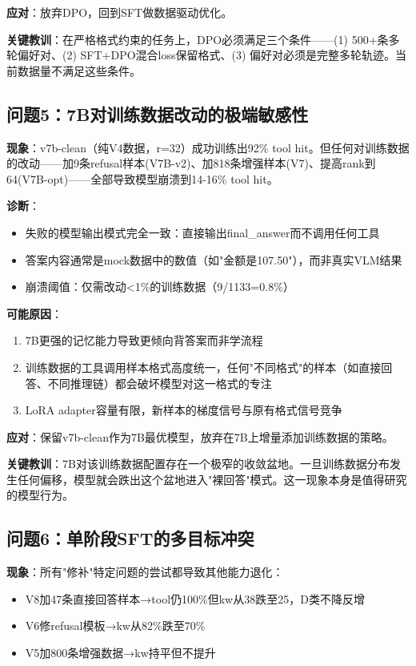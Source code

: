 \documentclass[fontset=none,11pt,a4paper]{ctexart}
\begin{document}
\textbf{应对}：放弃DPO，回到SFT做数据驱动优化。

\textbf{关键教训}：在严格格式约束的任务上，DPO必须满足三个条件------(1) 500+条多轮偏好对、(2) SFT+DPO混合loss保留格式、(3) 偏好对必须是完整多轮轨迹。当前数据量不满足这些条件。

\subsection{问题5：7B对训练数据改动的极端敏感性}

\textbf{现象}：v7b-clean（纯V4数据，r=32）成功训练出92\% tool hit。但任何对训练数据的改动------加9条refusal样本(V7B-v2)、加818条增强样本(V7)、提高rank到64(V7B-opt)------全部导致模型崩溃到14-16\% tool hit。

\textbf{诊断}：
\begin{itemize}[nosep]
    \item 失败的模型输出模式完全一致：直接输出final\_answer而不调用任何工具
    \item 答案内容通常是mock数据中的数值（如"金额是107.50"），而非真实VLM结果
    \item 崩溃阈值：仅需改动<1\%的训练数据（9/1133=0.8\%）
\end{itemize}

\textbf{可能原因}：
\begin{enumerate}[label=(\arabic*),nosep]
    \item 7B更强的记忆能力导致更倾向背答案而非学流程
    \item 训练数据的工具调用样本格式高度统一，任何"不同格式"的样本（如直接回答、不同推理链）都会破坏模型对这一格式的专注
    \item LoRA adapter容量有限，新样本的梯度信号与原有格式信号竞争
\end{enumerate}

\textbf{应对}：保留v7b-clean作为7B最优模型，放弃在7B上增量添加训练数据的策略。

\textbf{关键教训}：7B对该训练数据配置存在一个极窄的收敛盆地。一旦训练数据分布发生任何偏移，模型就会跌出这个盆地进入"裸回答"模式。这一现象本身是值得研究的模型行为。

\subsection{问题6：单阶段SFT的多目标冲突}

\textbf{现象}：所有"修补"特定问题的尝试都导致其他能力退化：
\begin{itemize}[nosep]
    \item V8加47条直接回答样本→tool仍100\%但kw从38跌至25，D类不降反增
    \item V6修refusal模板→kw从82\%跌至70\%
    \item V5加800条增强数据→kw持平但不提升
\end{itemize}
\end{document}
